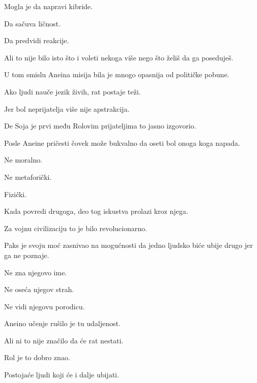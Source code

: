 \bigskip

Mogla je da napravi kibride.

Da sačuva ličnost.

Da predvidi reakcije.

\bigskip

Ali to nije bilo isto što i voleti nekoga više nego što želiš da ga poseduješ.

\bigskip

U tom smislu Aneina misija bila je mnogo opasnija od političke pobune.

\bigskip

Ako ljudi nauče jezik živih, rat postaje teži.

\bigskip

Jer bol neprijatelja više nije apstrakcija.

\bigskip

De Soja je prvi među Rolovim prijateljima to jasno izgovorio.

\bigskip

Posle Aneine pričesti čovek može bukvalno da oseti bol onoga koga napada.

\bigskip

Ne moralno.

Ne metaforički.

\bigskip

Fizički.

\bigskip

Kada povredi drugoga, deo tog iskustva prolazi kroz njega.

\bigskip

Za vojnu civilizaciju to je bilo revolucionarno.

\bigskip

Paks je svoju moć zasnivao na mogućnosti da jedno ljudsko biće ubije drugo jer ga ne poznaje.

\bigskip

Ne zna njegovo ime.

Ne oseća njegov strah.

Ne vidi njegovu porodicu.

\bigskip

Aneino učenje rušilo je tu udaljenost.

\bigskip

Ali ni to nije značilo da će rat nestati.

\bigskip

Rol je to dobro znao.

\bigskip

Postojaće ljudi koji će i dalje ubijati.


